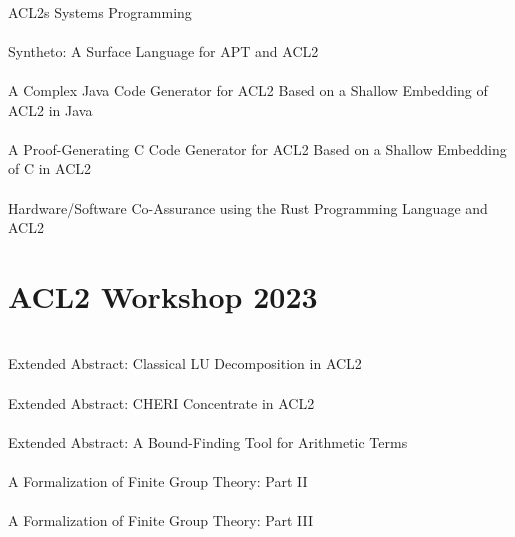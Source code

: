 \documentclass{article}
\begin{document}
\cite{22-walter-systems} \\
{ACL2s} Systems Programming \\

\cite{22-coglio-syntheto} \\
Syntheto: {A} Surface Language for {APT} and {ACL2} \\

\cite{22-coglio-java} \\
A Complex Java Code Generator for {ACL2} Based on a Shallow Embedding of {ACL2} in Java \\

\cite{22-coglio-c} \\
A Proof-Generating {C} Code Generator for {ACL2} Based on a Shallow Embedding of {C} in {ACL2} \\

\cite{22-hardin-rust} \\
Hardware/Software Co-Assurance using the Rust Programming Language and {ACL2} \\


\section{ACL2 Workshop 2023}

\cite{23-kwan-lu} \\
Extended Abstract: Classical LU Decomposition in {ACL2} \\

\cite{23-kwan-cheri} \\
Extended Abstract: {CHERI} Concentrate in {ACL2} \\

\cite{23-swords-bounds} \\
Extended Abstract: A Bound-Finding Tool for Arithmetic Terms \\

\cite{23-russinoff-groups-two} \\
A Formalization of Finite Group Theory: Part {II} \\

\cite{23-russinoff-groups-three} \\
A Formalization of Finite Group Theory: Part {III} \\
\end{document}
